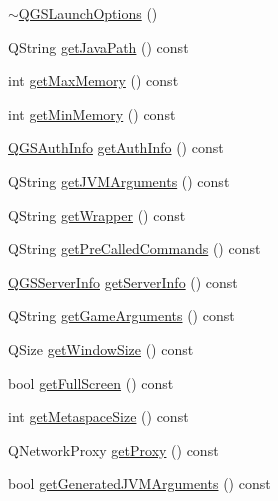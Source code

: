 \begin{DoxyCompactItemize}
\item 
\mbox{\hyperlink{class_q_g_s_launch_options_a9550062ba7e700f65f1192ab4e8040e5}{$\sim$\+Q\+G\+S\+Launch\+Options}} ()
\item 
Q\+String \mbox{\hyperlink{class_q_g_s_launch_options_a8ddb590dc1648e6f3cfdbe4086874b85}{get\+Java\+Path}} () const
\item 
int \mbox{\hyperlink{class_q_g_s_launch_options_a43d15874a6b37e3dfa58749fce62ae48}{get\+Max\+Memory}} () const
\item 
int \mbox{\hyperlink{class_q_g_s_launch_options_a51a9cf1727a4deab9b4497bd62815521}{get\+Min\+Memory}} () const
\item 
\mbox{\hyperlink{class_q_g_s_auth_info}{Q\+G\+S\+Auth\+Info}} \mbox{\hyperlink{class_q_g_s_launch_options_afcd94568981aa1b34005202af81c4724}{get\+Auth\+Info}} () const
\item 
Q\+String \mbox{\hyperlink{class_q_g_s_launch_options_a524c4b09d6f234ed925232a61bf8495d}{get\+J\+V\+M\+Arguments}} () const
\item 
Q\+String \mbox{\hyperlink{class_q_g_s_launch_options_afc7d6d612f6831b4d0cff5d4e33ef758}{get\+Wrapper}} () const
\item 
Q\+String \mbox{\hyperlink{class_q_g_s_launch_options_ac8a3c4e21a9ca055ebb2873e26c2e0c5}{get\+Pre\+Called\+Commands}} () const
\item 
\mbox{\hyperlink{class_q_g_s_server_info}{Q\+G\+S\+Server\+Info}} \mbox{\hyperlink{class_q_g_s_launch_options_af41e3edd195a48e87572361ddce2ed14}{get\+Server\+Info}} () const
\item 
Q\+String \mbox{\hyperlink{class_q_g_s_launch_options_a42442f043c3feec695fb9ad82e1edf1f}{get\+Game\+Arguments}} () const
\item 
Q\+Size \mbox{\hyperlink{class_q_g_s_launch_options_a56d0dc0a1eb89a1987591d9e20231672}{get\+Window\+Size}} () const
\item 
bool \mbox{\hyperlink{class_q_g_s_launch_options_a9ed53a43f8a70c1c1519ed0d6d2d1b7d}{get\+Full\+Screen}} () const
\item 
int \mbox{\hyperlink{class_q_g_s_launch_options_af39167f16818cc6ff86ec17eb370d9d1}{get\+Metaspace\+Size}} () const
\item 
Q\+Network\+Proxy \mbox{\hyperlink{class_q_g_s_launch_options_a361007c9f185031138a84084234d756a}{get\+Proxy}} () const
\item 
bool \mbox{\hyperlink{class_q_g_s_launch_options_a37cede37fe240457e9cd103aa160972c}{get\+Generated\+J\+V\+M\+Arguments}} () const
\item 

\end{DoxyCompactItemize}
